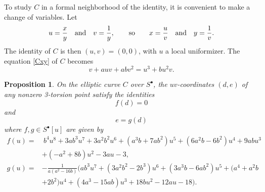 \documentclass{gtpart}
\newtheorem{prop}[thm]{Proposition}
\theoremstyle{definition}
\theoremstyle{remark}
\newcommand{\ad}{{\rm and}}
\newcommand{\s}{S^\bullet}
\begin{document}
To study $C$ in a formal neighborhood of the identity, it is convenient 
to make a change of variables.  Let 
\[
 u = \frac{x}{y} \quad \ad \quad v = \frac{1}{y}, \qquad {\rm so} \qquad x = \frac{u}{v} \quad \ad \quad y = \frac{1}{v}.  
\]
The identity of $C$ is then $(u,v) = (0,0)$, with $u$ a local 
uniformizer.  The equation \eqref{Cxy} of $C$ becomes 
\begin{equation}
\label{Cuv}
 v + a u v + a b v^2 = u^3 + b u^2 v.  
\end{equation}

\begin{prop}
\label{prop:tors}
 On the elliptic curve $C$ over $\s$, the $uv$-coordinates $(d,e)$ of 
 any nonzero 3-torsion point satisfy the identities 
 \begin{equation}
 \label{f}
  f(d) = 0 
 \end{equation}
 and 
 \begin{equation}
 \label{g}
  e = g(d) 
 \end{equation}
 where $f, g \in \s [u]$ are given by 
 \begin{equation*}
 \begin{split}
  f(u) = & ~ b^4 u^8 + 3 a b^3 u^7 + 3 a^2 b^2 u^6 + (a^3 b + 7 a b^2) u^5 + (6 a^2 b - 6 b^2) u^4 + 9 a b u^3 \\
         & + (-a^2 + 8 b) u^2 - 3 a u - 3, \\
  g(u) = & -\frac{1}{a (a^2 - 16 b)} \big( a b^3 u^7 + (3 a^2 b^2 - 2 b^3) u^6 + (3 a^3 b -6 a b^2) u^5 + (a^4 + a^2 b \\
         & + 2 b^2) u^4 + (4 a^3 - 15 a b) u^3 + 18 b u^2 - 12 a u - 18 \big).  
 \end{split}
 \end{equation*}
\end{prop}
\end{document}
